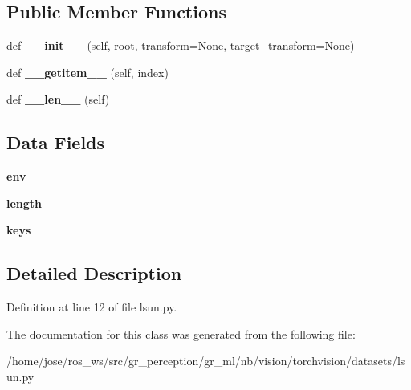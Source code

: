 \subsection*{Public Member Functions}
\begin{DoxyCompactItemize}
\item 
\mbox{\label{classtorchvision_1_1datasets_1_1lsun_1_1LSUNClass_af201b2dafc233ce9a08c5f1c949dde2b}} 
def {\bfseries \+\_\+\+\_\+init\+\_\+\+\_\+} (self, root, transform=None, target\+\_\+transform=None)
\item 
\mbox{\label{classtorchvision_1_1datasets_1_1lsun_1_1LSUNClass_aea6d35a2a851ab5eb933f4daf2218d2f}} 
def {\bfseries \+\_\+\+\_\+getitem\+\_\+\+\_\+} (self, index)
\item 
\mbox{\label{classtorchvision_1_1datasets_1_1lsun_1_1LSUNClass_ac974ce90de3ce8dd25944f2a7e91da0c}} 
def {\bfseries \+\_\+\+\_\+len\+\_\+\+\_\+} (self)
\end{DoxyCompactItemize}
\subsection*{Data Fields}
\begin{DoxyCompactItemize}
\item 
\mbox{\label{classtorchvision_1_1datasets_1_1lsun_1_1LSUNClass_aa02a42fc192760ab13f95d4d04d75db8}} 
{\bfseries env}
\item 
\mbox{\label{classtorchvision_1_1datasets_1_1lsun_1_1LSUNClass_a7305ca6ec5496df1d42ae65e8b8b43db}} 
{\bfseries length}
\item 
\mbox{\label{classtorchvision_1_1datasets_1_1lsun_1_1LSUNClass_ad304cb6c0bcb2de4fc362786b063e3c9}} 
{\bfseries keys}
\end{DoxyCompactItemize}


\subsection{Detailed Description}


Definition at line 12 of file lsun.\+py.



The documentation for this class was generated from the following file\+:\begin{DoxyCompactItemize}
\item 
/home/jose/ros\+\_\+ws/src/gr\+\_\+perception/gr\+\_\+ml/nb/vision/torchvision/datasets/lsun.\+py\end{DoxyCompactItemize}
